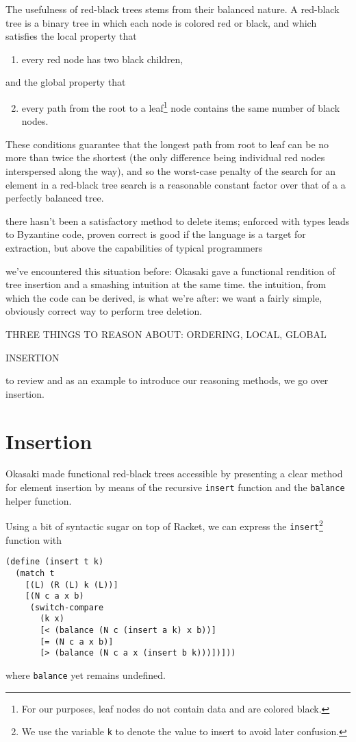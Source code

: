 \documentclass[preprint]{sigplanconf}
\begin{document}
The usefulness of red-black trees stems from their balanced nature. A red-black tree is a binary tree in which each node is colored red or black, and which satisfies the local property that
\begin{enumerate}
\item every red node has two black children,
\end{enumerate}
and the global property that
\begin{enumerate}
\setcounter{enumi}{1}
\item every path from the root to a leaf\footnote{For our purposes, leaf nodes do not contain data and are colored black.} node contains the same number of black nodes.
\end{enumerate}
These conditions guarantee that the longest path from root to leaf can be no more than twice the shortest (the only difference being individual red nodes interspersed along the way), and so the worst-case penalty of the search for an element in a red-black tree search is a reasonable constant factor over that of a a perfectly balanced tree.

there hasn't been a satisfactory method to delete items; enforced with types leads to Byzantine code, proven correct is good if the language is a target for extraction, but above the capabilities of typical programmers

we've encountered this situation before: Okasaki gave a functional rendition of tree insertion and a smashing intuition at the same time. the intuition, from which the code can be derived, is what we're after: we want a fairly simple, obviously correct way to perform tree deletion.

THREE THINGS TO REASON ABOUT: ORDERING, LOCAL, GLOBAL

INSERTION

to review and as an example to introduce our reasoning methods, we go over insertion.

\section{Insertion}

Okasaki \cite{okasaki1999functional} made functional red-black trees accessible by presenting a clear method for element insertion by means of the recursive \texttt{insert} function and the \texttt{balance} helper function.

Using a bit of syntactic sugar on top of Racket, we can express the \texttt{insert}\footnote{We use the variable \texttt{k} to denote the value to insert to avoid later confusion.} function with
\begin{verbatim}
(define (insert t k)
  (match t
    [(L) (R (L) k (L))]
    [(N c a x b)
     (switch-compare
       (k x)
       [< (balance (N c (insert a k) x b))]
       [= (N c a x b)]
       [> (balance (N c a x (insert b k)))])]))
\end{verbatim}
where \texttt{balance} yet remains undefined.
\end{document}
